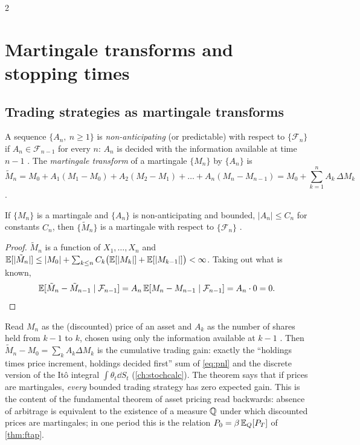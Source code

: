 \begin{paracol}{2}
\section{Martingale transforms and stopping times}\label{ch04:sec-stopping}

\subsection{Trading strategies as martingale transforms}
\begin{definition}
A sequence $\{A_n,\ n\ge1\}$ is \emph{non-anticipating} (or predictable) with respect to $\{\mathcal F_n\}$ if
$A_n\in\mathcal F_{n-1}$ for every $n$: $A_n$ is decided with the information available at time $n-1$
. The \emph{martingale transform} of a martingale $\{M_n\}$ by $\{A_n\}$ is
\[
  \tilde M_n=M_0+A_1(M_1-M_0)+A_2(M_2-M_1)+\dots+A_n(M_n-M_{n-1})
  =M_0+\sum_{k=1}^nA_k\,\Delta M_k
\]
.
\end{definition}

\begin{theorem}\label{ch04:thm-transform}
If $\{M_n\}$ is a martingale and $\{A_n\}$ is non-anticipating and bounded, $|A_n|\le C_n$ for constants
$C_n$, then $\{\tilde M_n\}$ is a martingale with respect to $\{\mathcal F_n\}$ .
\end{theorem}
\begin{proof}
$\tilde M_n$ is a function of $X_1,\dots,X_n$ and
$\mathbb{E}[|\tilde M_n|]\le|M_0|+\sum_{k\le n}C_k\bigl(\mathbb{E}[|M_k|]+\mathbb{E}[|M_{k-1}|]\bigr)<\infty$. Taking out what is known,
\[
  \mathbb{E}[\tilde M_n-\tilde M_{n-1}\mid\mathcal F_{n-1}]=A_n\,\mathbb{E}[M_n-M_{n-1}\mid\mathcal F_{n-1}]=A_n\cdot0=0 .
  \qedhere
\]
\end{proof}

\begin{finance}
Read $M_n$ as the (discounted) price of an asset and $A_k$ as the number of shares held from $k-1$ to $k$,
chosen using only the information available at $k-1$ . Then $\tilde M_n-M_0=\sum_kA_k\Delta M_k$ is
the cumulative trading gain: exactly the ``holdings times price increment, holdings decided first'' sum of
\eqref{eq:pnl} and the discrete version of the It\^o integral $\int\theta_t\dd S_t$ (\cref{ch:stochcalc}).
The theorem says that if prices are martingales, \emph{every} bounded trading strategy has zero expected gain.
This is the content of the fundamental theorem of asset pricing read backwards: absence of arbitrage is
equivalent to the existence of a measure $\mathbb{Q}$ under which discounted prices are martingales; in one period
this is the relation $P_0=\beta\,\mathbb{E}_Q[P_T]$ of \cref{thm:ftap}.
\end{finance}


\end{paracol}
